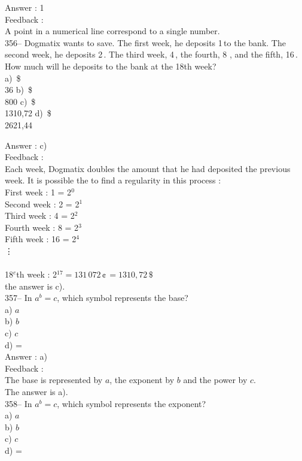 \documentclass[letterpaper, 12pt]{article}
\begin{document}
Answer : 1\\

Feedback : \\
A point in a numerical line correspond to a single number.\\

356-- Dogmatix wants to save. The first week, he deposits 1\,\cent to the bank. The second week, he deposits
2\,\cent. The third week, 4\,\cent, the fourth, 8\,\cent\,, and the fifth, 16\,\cent.  How much will he deposits to the bank at the 18th week?\\
a) \,\$\\36
b) \,\$\\800
c) \,\$\\1310,72
d) \,\$\\2621,44

Answer : c) \\

Feedback : \\
Each week, Dogmatix doubles the amount that he had deposited the previous week. It is possible the to find a regularity in this process :\\
First week : 1\,\cent\,= 2$^{0}$\\
Second week : 2\,\cent\,= 2$^{1}$\\
Third week : 4\,\cent\,= 2$^{2}$\\
Fourth week : 8\,\cent\,= 2$^{3}$\\
Fifth week : 16\,\cent\,= 2$^{4}$\\
\vdots\\\\
18$^e$th week : 2$^{17}=131\,072\,\cent\,=1310,72\,\$$\\
the answer is c).\\

357-- In $a^{b}=c$, which symbol represents the base?\\
a) $a$\\
b) $b$\\
c) $c$\\
d) =\\

Answer : a)\\

Feedback : \\
The base is represented by $a$, the exponent by $b$ and the power by $c$.\\
The answer is a).\\

358-- In $a^{b}=c$, which symbol represents the exponent?\\
a) $a$\\
b) $b$\\
c) $c$\\
d) =\\
\end{document}
